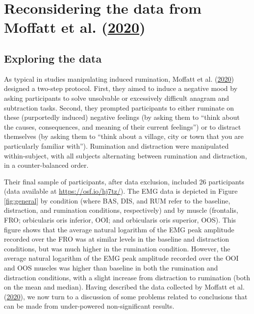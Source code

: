 \documentclass[
  man, donotrepeattitle,floatsintext]{apa6}
\begin{document}
\hypertarget{reconsidering-the-data-from-moffatt_inner_2020}{%
\section{\texorpdfstring{Reconsidering the data from Moffatt et al. (\protect\hyperlink{ref-moffatt_inner_2020}{2020})}{Reconsidering the data from Moffatt et al. (2020)}}\label{reconsidering-the-data-from-moffatt_inner_2020}}

\hypertarget{exploring-the-data}{%
\subsection{Exploring the data}\label{exploring-the-data}}

As typical in studies manipulating induced rumination, Moffatt et al. (\protect\hyperlink{ref-moffatt_inner_2020}{2020}) designed a two-step protocol. First, they aimed to induce a negative mood by asking participants to solve unsolvable or excessively difficult anagram and subtraction tasks. Second, they prompted participants to either ruminate on these (purportedly induced) negative feelings (by asking them to ``think about the causes, consequences, and meaning of their current feelings'') or to distract themselves (by asking them to ``think about a village, city or town that you are particularly familiar with''). Rumination and distraction were manipulated within-subject, with all subjects alternating between rumination and distraction, in a counter-balanced order.

Their final sample of participants, after data exclusion, included 26 participants (data available at \url{https://osf.io/hj7tz/}). The EMG data is depicted in Figure \ref{fig:general} by condition (where BAS, DIS, and RUM refer to the baseline, distraction, and rumination conditions, respectively) and by muscle (frontalis, FRO; orbicularis oris inferior, OOI; and orbicularis oris superior, OOS). This figure shows that the average natural logarithm of the EMG peak amplitude recorded over the FRO was at similar levels in the baseline and distraction conditions, but was much higher in the rumination condition. However, the average natural logarithm of the EMG peak amplitude recorded over the OOI and OOS muscles was higher than baseline in both the rumination and distraction conditions, with a slight increase from distraction to rumination (both on the mean and median). Having described the data collected by Moffatt et al. (\protect\hyperlink{ref-moffatt_inner_2020}{2020}), we now turn to a discussion of some problems related to conclusions that can be made from under-powered non-significant results.
\end{document}
